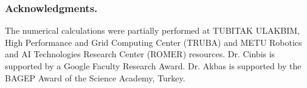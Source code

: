 \documentclass[runningheads]{llncs}
\begin{document}
\subsubsection{Acknowledgments.}


The numerical calculations were partially performed at TUBITAK ULAKBIM, High Performance and Grid Computing Center (TRUBA) and METU Robotics and AI Technologies Research Center (ROMER) resources. Dr. Cinbis is supported by a Google Faculty Research Award. Dr. Akbas is supported by the BAGEP Award of the Science Academy, Turkey.




\par\vfill\par


\clearpage


\end{document}
